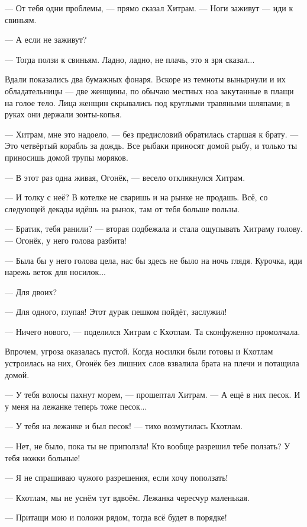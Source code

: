 \documentclass[a4paper,10pt,fleqn]{book}\usepackage{cooltooltips}\usepackage{polyglossia}\setdefaultlanguage{english}\setotherlanguage{russian}\defaultfontfeatures{Ligatures=TeX,Mapping=tex-text} \usepackage{xcolor}\definecolor{lightgray}{HTML}{bbbbbb}\color{lightgray}\newcommand{\ml}[3]{\textcolor{black}{#3}}
\newcommand{\asterism}{\vspace{1em}{\centering\Large\bfseries$\ast~\ast~\ast$\par}\vspace{1em}}
\begin{document}
--- От тебя одни проблемы, --- прямо сказал Хитрам.
--- Ноги заживут --- иди к свиньям.

--- А если не заживут?

--- Тогда ползи к свиньям.
Ладно, ладно, не плачь, это я зря сказал...

Вдали показались два бумажных фонаря.
Вскоре из темноты вынырнули и их обладательницы --- две женщины, по обычаю местных ноа закутанные в плащи на голое тело.
Лица женщин скрывались под круглыми травяными шляпами;
в руках они держали зонты-копья.

--- Хитрам, мне это надоело, --- без предисловий обратилась старшая к брату.
--- Это четвёртый корабль за дождь.
Все рыбаки приносят домой рыбу, и только ты приносишь домой трупы моряков.

--- В этот раз одна живая, Огонёк, --- весело откликнулся Хитрам.

--- И толку с неё?
В котелке не сваришь и на рынке не продашь.
Всё, со следующей декады идёшь на рынок, там от тебя больше пользы.

--- Братик, тебя ранили? --- вторая подбежала и стала ощупывать Хитраму голову.
--- Огонёк, у него голова разбита!

--- Была бы у него голова цела, нас бы здесь не было на ночь глядя.
Курочка, иди нарежь веток для носилок...

--- Для двоих?

--- Для одного, глупая!
Этот дурак пешком пойдёт, заслужил!

--- Ничего нового, --- поделился Хитрам с Кхотлам.
Та сконфуженно промолчала.

Впрочем, угроза оказалась пустой.
Когда носилки были готовы и Кхотлам устроилась на них, Огонёк без лишних слов взвалила брата на плечи и потащила домой.

\asterism

--- У тебя волосы пахнут морем, --- прошептал Хитрам.
--- А ещё в них песок.
И у меня на лежанке теперь тоже песок...

--- У тебя на лежанке и был песок! --- тихо возмутилась Кхотлам.

--- Нет, не было, пока ты не приползла!
Кто вообще разрешил тебе ползать?
У тебя ножки больные!

--- Я не спрашиваю чужого разрешения, если хочу поползать!

--- Кхотлам, мы не уснём тут вдвоём.
Лежанка чересчур маленькая.

--- Притащи мою и положи рядом, тогда всё будет в порядке!
\end{document}
